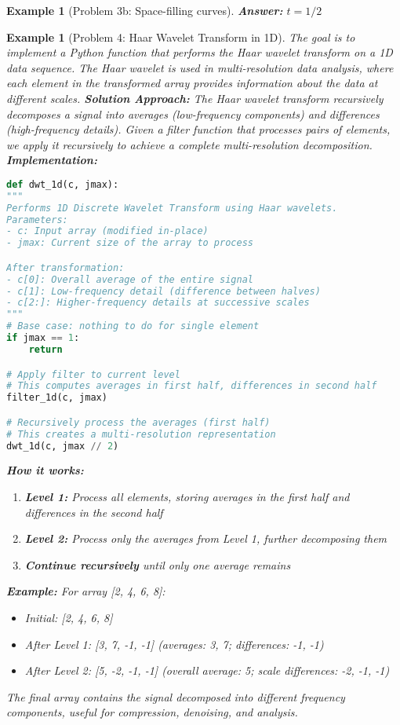 \documentclass[11pt,a4paper]{article}
\newtheorem{example}[theorem]{Example}
\begin{document}
\begin{example}[Problem 3b: Space-filling curves]
\textbf{Answer:} $t = 1/2$
\end{example}

\begin{example}[Problem 4: Haar Wavelet Transform in 1D]
The goal is to implement a Python function that performs the Haar wavelet transform on a 1D data sequence. The Haar wavelet is used in multi-resolution data analysis, where each element in the transformed array provides information about the data at different scales.
\textbf{Solution Approach:}
The Haar wavelet transform recursively decomposes a signal into averages (low-frequency components) and differences (high-frequency details). Given a filter function that processes pairs of elements, we apply it recursively to achieve a complete multi-resolution decomposition.
\textbf{Implementation:}
\begin{lstlisting}[language=Python]
def dwt_1d(c, jmax):
"""
Performs 1D Discrete Wavelet Transform using Haar wavelets.
Parameters:
- c: Input array (modified in-place)
- jmax: Current size of the array to process

After transformation:
- c[0]: Overall average of the entire signal
- c[1]: Low-frequency detail (difference between halves)
- c[2:]: Higher-frequency details at successive scales
"""
# Base case: nothing to do for single element
if jmax == 1:
    return

# Apply filter to current level
# This computes averages in first half, differences in second half
filter_1d(c, jmax)

# Recursively process the averages (first half)
# This creates a multi-resolution representation
dwt_1d(c, jmax // 2)
\end{lstlisting}
\textbf{How it works:}
\begin{enumerate}
\item \textbf{Level 1:} Process all elements, storing averages in the first half and differences in the second half
\item \textbf{Level 2:} Process only the averages from Level 1, further decomposing them
\item \textbf{Continue recursively} until only one average remains
\end{enumerate}
\textbf{Example:} For array [2, 4, 6, 8]:
\begin{itemize}
\item Initial: [2, 4, 6, 8]
\item After Level 1: [3, 7, -1, -1] (averages: 3, 7; differences: -1, -1)
\item After Level 2: [5, -2, -1, -1] (overall average: 5; scale differences: -2, -1, -1)
\end{itemize}
The final array contains the signal decomposed into different frequency components, useful for compression, denoising, and analysis.
\end{example}
\end{document}
